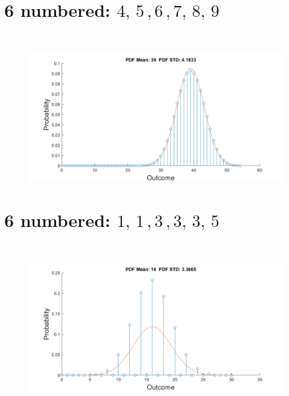 \documentclass[12pt,letterpaper, onecolumn]{exam}
\begin{document}
\begin{questions}
\begin{parts}
        \part{6 numbered: $4,\,5\,,6\,,7,\,8,\,9$}\\
		        \solution
		        \begin{figure}[!h]
		            \centering
		            \includegraphics[width=.91\linewidth]{Q1_b.png}
		        \end{figure}
        \part{6 numbered: $1,\,1\,,3\,,3,\,3,\,5$}\\
		        \solution
		        \begin{figure}[!h]
		            \centering
		            \includegraphics[width=.91\linewidth]{Q1_c.png}
		        \end{figure}
		        \clearpage

\end{parts}
\end{questions}
\end{document}
